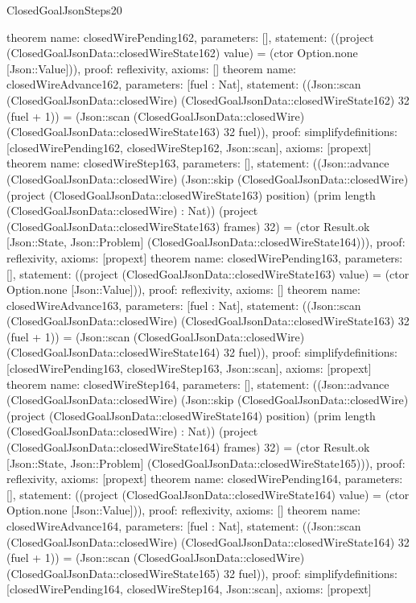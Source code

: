 \begin{lexlean}{ClosedGoalJsonSteps20}
\begin{semanticmodule}
{}
theorem{
 name: closedWirePending162, parameters: [],
 statement: ((project (ClosedGoalJsonData::closedWireState162) value) = (ctor Option.none [Json::Value])), proof: reflexivity{}, axioms: []
}
theorem{
 name: closedWireAdvance162, parameters: [fuel : Nat],
 statement: ((Json::scan (ClosedGoalJsonData::closedWire) (ClosedGoalJsonData::closedWireState162) 32 (fuel + 1)) = (Json::scan (ClosedGoalJsonData::closedWire) (ClosedGoalJsonData::closedWireState163) 32 fuel)), proof: simplify{definitions: [closedWirePending162, closedWireStep162, Json::scan]}, axioms: [propext]
}
theorem{
 name: closedWireStep163, parameters: [],
 statement: ((Json::advance (ClosedGoalJsonData::closedWire) (Json::skip (ClosedGoalJsonData::closedWire) (project (ClosedGoalJsonData::closedWireState163) position) (prim length (ClosedGoalJsonData::closedWire) : Nat)) (project (ClosedGoalJsonData::closedWireState163) frames) 32) = (ctor Result.ok [Json::State, Json::Problem] (ClosedGoalJsonData::closedWireState164))), proof: reflexivity{}, axioms: [propext]
}
theorem{
 name: closedWirePending163, parameters: [],
 statement: ((project (ClosedGoalJsonData::closedWireState163) value) = (ctor Option.none [Json::Value])), proof: reflexivity{}, axioms: []
}
theorem{
 name: closedWireAdvance163, parameters: [fuel : Nat],
 statement: ((Json::scan (ClosedGoalJsonData::closedWire) (ClosedGoalJsonData::closedWireState163) 32 (fuel + 1)) = (Json::scan (ClosedGoalJsonData::closedWire) (ClosedGoalJsonData::closedWireState164) 32 fuel)), proof: simplify{definitions: [closedWirePending163, closedWireStep163, Json::scan]}, axioms: [propext]
}
theorem{
 name: closedWireStep164, parameters: [],
 statement: ((Json::advance (ClosedGoalJsonData::closedWire) (Json::skip (ClosedGoalJsonData::closedWire) (project (ClosedGoalJsonData::closedWireState164) position) (prim length (ClosedGoalJsonData::closedWire) : Nat)) (project (ClosedGoalJsonData::closedWireState164) frames) 32) = (ctor Result.ok [Json::State, Json::Problem] (ClosedGoalJsonData::closedWireState165))), proof: reflexivity{}, axioms: [propext]
}
theorem{
 name: closedWirePending164, parameters: [],
 statement: ((project (ClosedGoalJsonData::closedWireState164) value) = (ctor Option.none [Json::Value])), proof: reflexivity{}, axioms: []
}
theorem{
 name: closedWireAdvance164, parameters: [fuel : Nat],
 statement: ((Json::scan (ClosedGoalJsonData::closedWire) (ClosedGoalJsonData::closedWireState164) 32 (fuel + 1)) = (Json::scan (ClosedGoalJsonData::closedWire) (ClosedGoalJsonData::closedWireState165) 32 fuel)), proof: simplify{definitions: [closedWirePending164, closedWireStep164, Json::scan]}, axioms: [propext]
}
\end{semanticmodule}
\end{lexlean}
